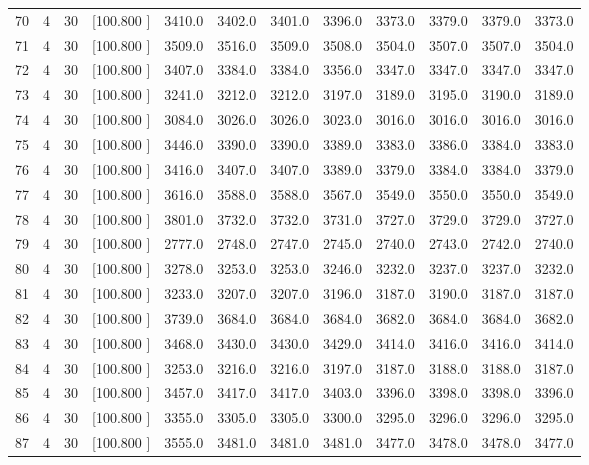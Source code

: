 \documentclass[12pt,a4paper]{article}
\begin{document}
\begin{center}
{\begin{tabular}{r r r r r r r r r r r r}
  70&  4& 30&[100.800   ]&  3410.0&  3402.0&  3401.0&  3396.0&  3373.0&  3379.0&  3379.0&  3373.0\\[-0.02in]
  71&  4& 30&[100.800   ]&  3509.0&  3516.0&  3509.0&  3508.0&  3504.0&  3507.0&  3507.0&  3504.0\\[-0.02in]
  72&  4& 30&[100.800   ]&  3407.0&  3384.0&  3384.0&  3356.0&  3347.0&  3347.0&  3347.0&  3347.0\\[-0.02in]
  73&  4& 30&[100.800   ]&  3241.0&  3212.0&  3212.0&  3197.0&  3189.0&  3195.0&  3190.0&  3189.0\\[-0.02in]
  74&  4& 30&[100.800   ]&  3084.0&  3026.0&  3026.0&  3023.0&  3016.0&  3016.0&  3016.0&  3016.0\\[-0.02in]
  75&  4& 30&[100.800   ]&  3446.0&  3390.0&  3390.0&  3389.0&  3383.0&  3386.0&  3384.0&  3383.0\\[-0.02in]
  76&  4& 30&[100.800   ]&  3416.0&  3407.0&  3407.0&  3389.0&  3379.0&  3384.0&  3384.0&  3379.0\\[-0.02in]
  77&  4& 30&[100.800   ]&  3616.0&  3588.0&  3588.0&  3567.0&  3549.0&  3550.0&  3550.0&  3549.0\\[-0.02in]
  78&  4& 30&[100.800   ]&  3801.0&  3732.0&  3732.0&  3731.0&  3727.0&  3729.0&  3729.0&  3727.0\\[-0.02in]
  79&  4& 30&[100.800   ]&  2777.0&  2748.0&  2747.0&  2745.0&  2740.0&  2743.0&  2742.0&  2740.0\\[-0.02in]
  80&  4& 30&[100.800   ]&  3278.0&  3253.0&  3253.0&  3246.0&  3232.0&  3237.0&  3237.0&  3232.0\\[-0.02in]
  81&  4& 30&[100.800   ]&  3233.0&  3207.0&  3207.0&  3196.0&  3187.0&  3190.0&  3187.0&  3187.0\\[-0.02in]
  82&  4& 30&[100.800   ]&  3739.0&  3684.0&  3684.0&  3684.0&  3682.0&  3684.0&  3684.0&  3682.0\\[-0.02in]
  83&  4& 30&[100.800   ]&  3468.0&  3430.0&  3430.0&  3429.0&  3414.0&  3416.0&  3416.0&  3414.0\\[-0.02in]
  84&  4& 30&[100.800   ]&  3253.0&  3216.0&  3216.0&  3197.0&  3187.0&  3188.0&  3188.0&  3187.0\\[-0.02in]
  85&  4& 30&[100.800   ]&  3457.0&  3417.0&  3417.0&  3403.0&  3396.0&  3398.0&  3398.0&  3396.0\\[-0.02in]
  86&  4& 30&[100.800   ]&  3355.0&  3305.0&  3305.0&  3300.0&  3295.0&  3296.0&  3296.0&  3295.0\\[-0.02in]
  87&  4& 30&[100.800   ]&  3555.0&  3481.0&  3481.0&  3481.0&  3477.0&  3478.0&  3478.0&  3477.0\\[-0.02in]

\end{tabular}}
\end{center}
\end{document}
